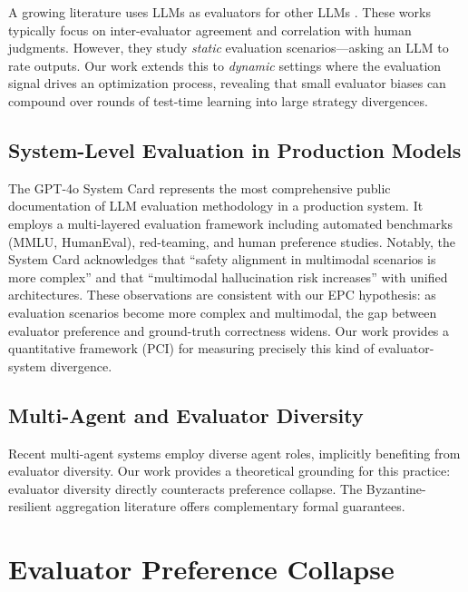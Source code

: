 \documentclass[11pt,a4paper]{article}
\begin{document}
A growing literature uses LLMs as evaluators for other LLMs \cite{zheng2023judging, li2024alpacaeval, chiang2024chatbot}. These works typically focus on inter-evaluator agreement and correlation with human judgments. However, they study \textit{static} evaluation scenarios---asking an LLM to rate outputs. Our work extends this to \textit{dynamic} settings where the evaluation signal drives an optimization process, revealing that small evaluator biases can compound over rounds of test-time learning into large strategy divergences.

\subsection{System-Level Evaluation in Production Models}

The GPT-4o System Card \cite{openai2024gpt4o} represents the most comprehensive public documentation of LLM evaluation methodology in a production system. It employs a multi-layered evaluation framework including automated benchmarks (MMLU, HumanEval), red-teaming, and human preference studies. Notably, the System Card acknowledges that ``safety alignment in multimodal scenarios is more complex'' and that ``multimodal hallucination risk increases'' with unified architectures. These observations are consistent with our EPC hypothesis: as evaluation scenarios become more complex and multimodal, the gap between evaluator preference and ground-truth correctness widens. Our work provides a quantitative framework (PCI) for measuring precisely this kind of evaluator-system divergence.

\subsection{Multi-Agent and Evaluator Diversity}

Recent multi-agent systems \cite{wu2023autogen, hong2023metagpt, chen2024chatdev} employ diverse agent roles, implicitly benefiting from evaluator diversity. Our work provides a theoretical grounding for this practice: evaluator diversity directly counteracts preference collapse. The Byzantine-resilient aggregation literature \cite{blanchard2017byzantine} offers complementary formal guarantees.

\section{Evaluator Preference Collapse}
\end{document}
